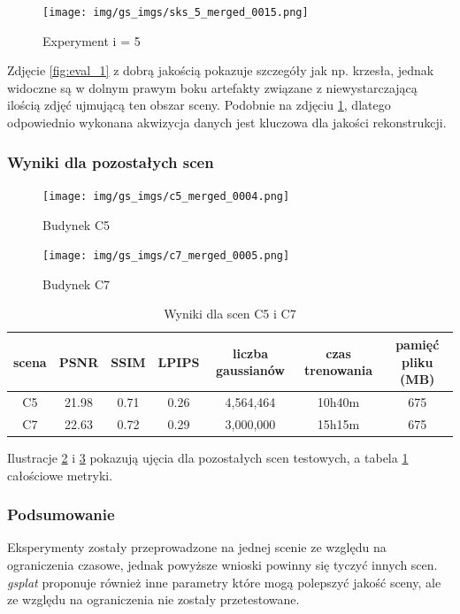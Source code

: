 \begin{figure}[!h]
    \centering
    \texttt{[image: img/gs\_imgs/sks\_5\_merged\_0015.png]}
    \caption{Experyment i = 5}\label{fig:eval_2}
\end{figure}

Zdjęcie \ref{fig:eval_1} z dobrą jakością pokazuje szczegóły jak np. krzesła, jednak widoczne są w dolnym prawym boku artefakty związane z niewystarczającą ilością zdjęć ujmującą ten obszar sceny. Podobnie na zdjęciu \ref{fig:eval_2}, dlatego odpowiednio wykonana akwizycja danych jest kluczowa dla jakości rekonstrukcji.

\subsubsection{Wyniki dla pozostałych scen}

\begin{figure}[!h]
    \centering
    \texttt{[image: img/gs\_imgs/c5\_merged\_0004.png]}
    \caption{Budynek C5}\label{fig:c5_gt}
\end{figure}

\begin{figure}[!h]
    \centering
    \texttt{[image: img/gs\_imgs/c7\_merged\_0005.png]}
    \caption{Budynek C7}\label{fig:c7_gt}
\end{figure}

\begin{table}[!h]
    \centering
    \begin{tabular}{|c|c|c|c|c|c|c|}
    \hline
    scena & PSNR & SSIM & LPIPS & liczba gaussianów & czas trenowania & pamięć pliku (MB) \\
    \hline 
    C5 & 21.98 & 0.71 & 0.26 & 4,564,464 & 10h40m & 675 \\
    \hline 
    C7 & 22.63 & 0.72 & 0.29 & 3,000,000 & 15h15m & 675 \\
    \hline
    \end{tabular}
\caption{Wyniki dla scen C5 i C7}
\label{table:tab_gs_res}
\end{table}

Ilustracje \ref{fig:c5_gt} i \ref{fig:c7_gt} pokazują ujęcia dla pozostałych scen testowych, a tabela \ref{table:tab_gs_res} całościowe metryki.

\newpage

\subsubsection{Podsumowanie}
Eksperymenty zostały przeprowadzone na jednej scenie ze względu na ograniczenia czasowe, jednak powyższe wnioski powinny się tyczyć innych scen. \textit{gsplat} proponuje również inne parametry które mogą polepszyć jakość sceny, ale ze względu na ograniczenia nie zostały przetestowane. 